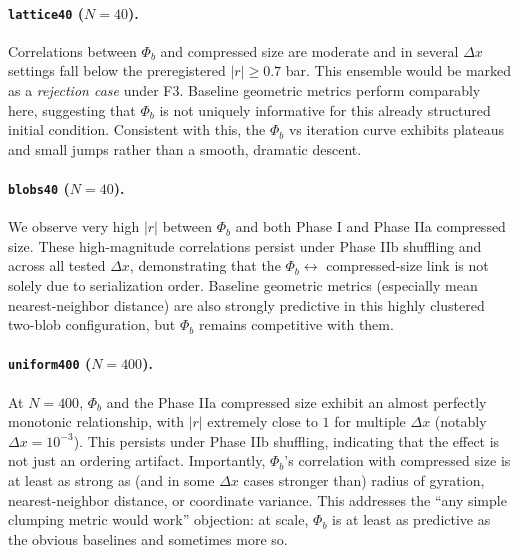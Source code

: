 \documentclass[11pt,a4paper]{article}
\numberwithin{equation}{section}
\newcommand{\phib}{\Phi_b}
\begin{document}
\paragraph{\texttt{lattice40} ($N{=}40$).}
Correlations between $\phib$ and compressed size are moderate and in several $\Delta x$ settings fall below the preregistered $|r|\ge 0.7$ bar. This ensemble would be marked as a \emph{rejection case} under F3. Baseline geometric metrics perform comparably here, suggesting that $\phib$ is not uniquely informative for this already structured initial condition. Consistent with this, the $\phib$ vs iteration curve exhibits plateaus and small jumps rather than a smooth, dramatic descent.

\paragraph{\texttt{blobs40} ($N{=}40$).}
We observe very high $|r|$ between $\phib$ and both Phase I and Phase IIa compressed size. These high-magnitude correlations persist under Phase IIb shuffling and across all tested $\Delta x$, demonstrating that the $\phib \leftrightarrow$ compressed-size link is not solely due to serialization order. Baseline geometric metrics (especially mean nearest-neighbor distance) are also strongly predictive in this highly clustered two-blob configuration, but $\phib$ remains competitive with them.

\paragraph{\texttt{uniform400} ($N{=}400$).}
At $N{=}400$, $\phib$ and the Phase IIa compressed size exhibit an almost perfectly monotonic relationship, with $|r|$ extremely close to $1$ for multiple $\Delta x$ (notably $\Delta x=10^{-3}$). This persists under Phase IIb shuffling, indicating that the effect is not just an ordering artifact. Importantly, $\phib$'s correlation with compressed size is at least as strong as (and in some $\Delta x$ cases stronger than) radius of gyration, nearest-neighbor distance, or coordinate variance. This addresses the ``any simple clumping metric would work'' objection: at scale, $\phib$ is at least as predictive as the obvious baselines and sometimes more so.
\end{document}
